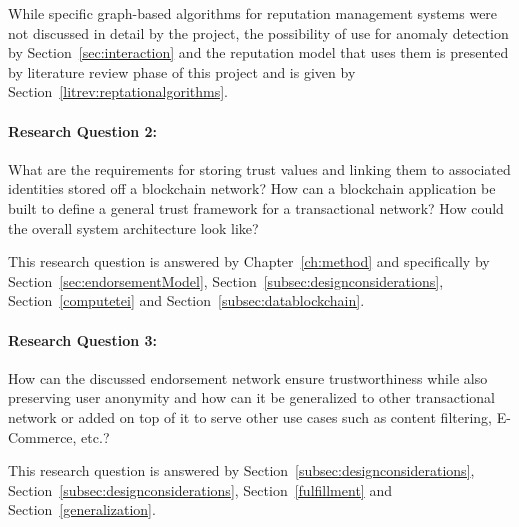 While specific graph-based algorithms for reputation management systems were
not discussed in detail by the project, the possibility of use for anomaly
detection by Section~\ref{sec:interaction} and the reputation model that uses
them is presented by literature review phase of this project and is given by
Section~\ref{litrev:reptationalgorithms}. 

\paragraph{Research Question 2:}What are the requirements for storing trust
values and linking them to associated identities stored off a blockchain
network? How can a blockchain application be built to define a general trust
framework for a transactional network? How could the overall system
architecture look like? \par

This research question is answered by Chapter~\ref{ch:method} and specifically
by Section~\ref{sec:endorsementModel},
Section~\ref{subsec:designconsiderations}, Section~\ref{computetei} and
Section~\ref{subsec:datablockchain}.

\paragraph{Research Question 3:}How can the discussed endorsement network
ensure trustworthiness while also preserving user anonymity and how can it be
generalized to other transactional network or added on top of it to serve other
use cases such as content filtering, E-Commerce, etc.? \par

This research question is answered by
Section~\ref{subsec:designconsiderations},
Section~\ref{subsec:designconsiderations}, Section~\ref{fulfillment} and
Section~\ref{generalization}.

